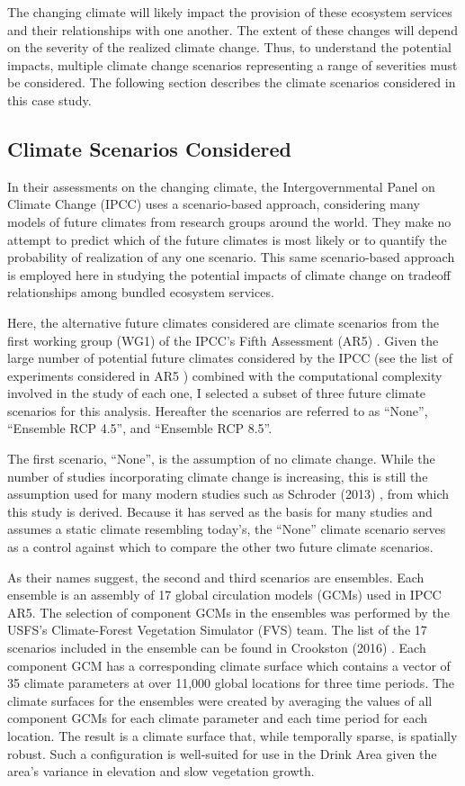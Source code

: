 The changing climate will likely impact the provision of these ecosystem services and their relationships with one another. The extent of these changes will depend on the severity of the realized climate change. Thus, to understand the potential impacts, multiple climate change scenarios representing a range of severities must be considered. The following section describes the climate scenarios considered in this case study.

\subsection{Climate Scenarios Considered}
In their assessments on the changing climate, the Intergovernmental Panel on Climate Change (IPCC) uses a scenario-based approach, considering many models of future climates from research groups around the world. They make no attempt to predict which of the future climates is most likely or to quantify the probability of realization of any one scenario. This same scenario-based approach is employed here in studying the potential impacts of climate change on tradeoff relationships among bundled ecosystem services.

Here, the alternative future climates considered are climate scenarios from the first working group (WG1) of the IPCC's Fifth Assessment (AR5) \cite{ipcc2013climate}. Given the large number of potential future climates considered by the IPCC (see the list of experiments considered in AR5 \cite{ipccListOfAR5Models}) combined with the computational complexity involved in the study of each one, I selected a subset of three future climate scenarios for this analysis. Hereafter the scenarios are referred to as ``None'', ``Ensemble RCP 4.5'', and ``Ensemble RCP 8.5''.

The first scenario, ``None'', is the assumption of no climate change. While the number of studies incorporating climate change is increasing, this is still the assumption used for many modern studies such as Schroder (2013) \cite{schroder2016multi}, from which this study is derived. Because it has served as the basis for many studies and assumes a static climate resembling today's, the ``None'' climate scenario serves as a control against which to compare the other two future climate scenarios.

As their names suggest, the second and third scenarios are ensembles. Each ensemble is an assembly of 17 global circulation models (GCMs) used in IPCC AR5. The selection of component GCMs in the ensembles was performed by the USFS's Climate-Forest Vegetation Simulator (FVS) \cite{dixon2002essential} team. The list of the 17 scenarios included in the ensemble can be found in Crookston (2016) \cite{ClimateModelsInFVSEnsemble}. Each component GCM has a corresponding climate surface which contains a vector of 35 climate parameters at over 11,000 global locations for three time periods. The climate surfaces for the ensembles were created by averaging the values of all component GCMs for each climate parameter and each time period for each location. The result is a climate surface that, while temporally sparse, is spatially robust. Such a configuration is well-suited for use in the Drink Area given the area's variance in elevation and slow vegetation growth.

